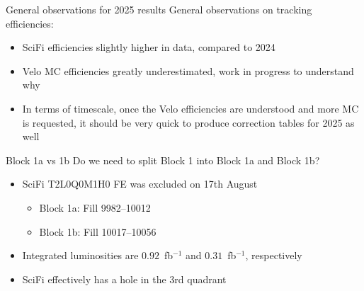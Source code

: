 \documentclass[xcolor={dvipsnames}]{beamer}
\begin{document}
\begin{frame}{General observations for 2025 results}
  \vspace{0.0cm}
  {\large General observations on tracking efficiencies:}
  \vspace{0.2cm}
  \begin{itemize}
    \setlength\itemsep{1.0em}
    \item{SciFi efficiencies slightly higher in data, compared to 2024}
    \item{Velo MC efficiencies greatly underestimated, work in progress to understand why}
    \item{In terms of timescale, once the Velo efficiencies are understood and more MC is requested, it should be very quick to produce correction tables for 2025 as well}
  \end{itemize}
\end{frame}

\begin{frame}{Block 1a vs 1b}
  \vspace{0.0cm}
  {\large Do we need to split Block 1 into Block 1a and Block 1b?}
  \vspace{0.4cm}
  \begin{itemize}
    \setlength\itemsep{1.5em}
    \item{SciFi T2L0Q0M1H0 FE was excluded on 17th August}
    \begin{itemize}
      \item[-]{Block 1a: Fill 9982--10012}
      \item[-]{Block 1b: Fill 10017--10056}
    \end{itemize}
    \item{Integrated luminosities are $0.92$~fb$^{-1}$ and $0.31$~fb$^{-1}$, respectively}
    \item{SciFi effectively has a hole in the 3rd quadrant}
  \end{itemize}
\end{frame}
\end{document}
